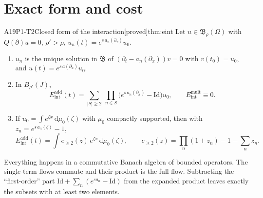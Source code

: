 \documentclass[11pt,a4paper,oneside]{report}
\newcommand{\badge}[2]{\textcolor{#1}{\textsf{\footnotesize[#2]}}}
\newcommand{\proved}{\badge{cC}{proved}}
\newcommand{\Eint}{E_{\mathrm{int}}}
\newcommand{\Id}{\mathrm{Id}}
\newcommand{\dd}{\,\mathrm{d}}
\newcommand{\Bclass}{\mathfrak{B}}
\newenvironment{dimcard}[5]{\par\Needspace{12\baselineskip}\begin{dimcardbox}{#1}{#2}{#3}{#4}{#5}}{\end{dimcardbox}}
\begin{document}
\section{Exact form and cost}

\begin{dimcard}{A19}{P1-T2}{Closed form of the interaction}{\proved}{thm:eint}
Let $u\in\Bclass_\rho(\Omega)$ with $Q(\partial)u=0$, $\rho'>\rho$, $u_n(t)=e^{s\,a_n(\partial_x)}u_0$.
\begin{enumerate}[label=(\roman*)]
\item $u_n$ is the unique solution in $\Bclass$ of $(\partial_t-a_n(\partial_x))v=0$ with $v(t_0)=u_0$, and $u(t)=e^{s\,a(\partial_x)}u_0$.
\item In $B_{\rho'}(J)$,
\[
\Eint^{\mathrm{add}}(t)=\sum_{|S|\ge2}\ \prod_{n\in S}\big(e^{s\,a_n(\partial_x)}-\Id\big)u_0,\qquad \Eint^{\mathrm{mult}}\equiv0 .
\]
\item If $u_0=\int e^{\zeta x}\dd\mu_0(\zeta)$ with $\mu_0$ compactly supported, then with $z_n=e^{s\,a_n(\zeta)}-1$,
\[
\Eint^{\mathrm{add}}(t)=\int e_{\ge2}(z)\,e^{\zeta x}\dd\mu_0(\zeta),\qquad e_{\ge2}(z)=\prod_n(1+z_n)-1-\sum_nz_n .
\]
\end{enumerate}
\end{dimcard}

\begin{proofidea}
Everything happens in a commutative Banach algebra of bounded operators. The single-term flows commute and their product is the full flow. Subtracting the ``first-order'' part $\Id+\sum_n(e^{sa_n}-\Id)$ from the expanded product leaves exactly the subsets with at least two elements.
\end{proofidea}
\end{document}

